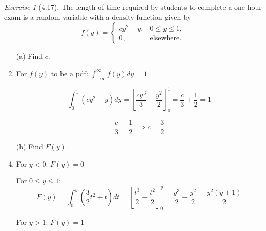\documentclass[12pt]{amsart}
\makeatletter
\theoremstyle{remark}
\newtheorem*{exercise}{Exercise}%
\renewenvironment{proof}[1][\proofname]{\par\doublespacing
  \pushQED{\qed}%
  \normalfont \topsep6\p@\@plus6\p@\relax
  \list{}{%
    \settowidth{\leftmargin}{\itshape\proofname:\hskip\labelsep}%
    \setlength{\labelwidth}{0pt}%
    \setlength{\itemindent}{-\leftmargin}%
  }%
  \item[\hskip\labelsep\itshape#1\@addpunct{:}]\ignorespaces
}{%
  \popQED\endlist\@endpefalse
  \singlespacing
}
\theoremstyle{mycomment}
\makeatother
\begin{document}
\begin{exercise}[4.17]
The length of time required by students to complete a one-hour exam is a random variable with a density function given by
$$f(y) = \begin{cases}
cy^2 + y, & 0 \leq y \leq 1, \\
0, & \text{elsewhere}.
\end{cases}$$

\begin{enumerate}
    \item[(a)] Find $c$.
\begin{proof}[Solution]
 	For $f(y)$ to be a pdf: $\int_{-\infty}^{\infty} f(y) dy = 1$
	
	$$\int_0^1 (cy^2 + y) dy = \left[\frac{cy^3}{3} + \frac{y^2}{2}\right]_0^1 = \frac{c}{3} + \frac{1}{2} = 1$$
	
	$$\frac{c}{3} = \frac{1}{2} \implies c = \frac{3}{2}$$
\end{proof}
    \item[(b)] Find $F(y)$.
\begin{proof}[Solution]
For $y < 0$: $F(y) = 0$
	
	For $0 \leq y \leq 1$:
	$$F(y) = \int_0^y \left(\frac{3}{2}t^2 + t\right) dt = \left[\frac{t^3}{2} + \frac{t^2}{2}\right]_0^y = \frac{y^3}{2} + \frac{y^2}{2} = \frac{y^2(y+1)}{2}$$
	
	For $y > 1$: $F(y) = 1$
	

\end{proof}
\end{enumerate}
\end{exercise}
\end{document}
